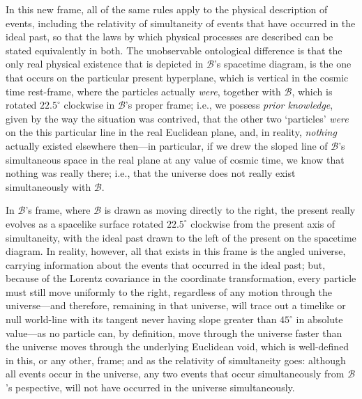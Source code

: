 In this new frame, all of the same rules apply to the physical description of events, including the relativity of simultaneity of events that have occurred in the ideal past, so that the laws by which physical processes are described can be stated equivalently in both. The unobservable ontological difference is that the only real physical existence that is depicted in $\mathcal{B}$'s spacetime diagram, is the one that occurs on the particular present hyperplane, which is vertical in the cosmic time rest-frame, where the particles actually \textit{were}, together with $\mathcal{B}$, which is rotated $22.5^{\circ}$ clockwise in $\mathcal{B}$'s proper frame; i.e., we possess \textit{prior knowledge}, given by the way the situation was contrived, that the other two `particles' \textit{were} on the this particular line in the real Euclidean plane, and, in reality, \textit{nothing} actually existed elsewhere then---in particular, if we drew the sloped line of $\mathcal{B}$'s simultaneous space in the real plane at any value of cosmic time, we know that nothing was really there; i.e., that the universe does not really exist simultaneously with $\mathcal{B}$. 

In $\mathcal{B}$'s frame, where $\mathcal{B}$ is drawn as moving directly to the right, the present really evolves as a spacelike surface rotated $22.5^{\circ}$ clockwise from the present axis of simultaneity, with the ideal past drawn to the left of the present on the spacetime diagram. In reality, however, all that exists in this frame is the angled universe, carrying information about the events that occurred in the ideal past; but, because of the Lorentz covariance in the coordinate transformation, every particle must still move uniformly to the right, regardless of any motion through the universe---and therefore, remaining in that universe, will trace out a timelike or null world-line with its tangent never having slope greater than $45^{\circ}$ in absolute value---as no particle can, by definition, move through the universe faster than the universe moves through the underlying Euclidean void, which is well-defined in this, or any other, frame; and as the relativity of simultaneity goes: although all events occur in the universe, any two events that occur simultaneously from $\mathcal{B}$'s pespective, will not have occurred in the universe simultaneously. 

